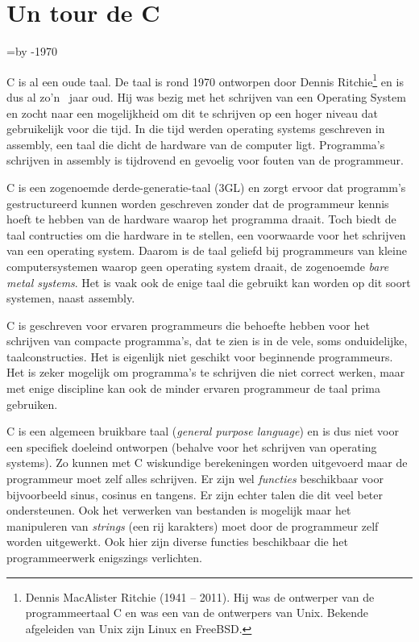 \chapter{Un tour de C}
\thispagestyle{empty}

\newcount\cdifference\cdifference=\the\year\advance\cdifference by -1970

C is al een oude taal. De taal is rond 1970 ontworpen door Dennis Ritchie\footnote{Dennis MacAlister Ritchie (1941 -- 2011). Hij was de ontwerper van de programmeertaal C en was een van de ontwerpers van Unix. Bekende afgeleiden van Unix zijn Linux en FreeBSD.} en is dus al zo'n \the\cdifference\ jaar oud. Hij was bezig met het schrijven van een Operating System en zocht naar een mogelijkheid om dit te schrijven op een hoger niveau dat gebruikelijk voor die tijd. In die tijd werden operating systems geschreven in assembly, een taal die dicht de hardware van de computer ligt. Programma's schrijven in assembly is tijdrovend en gevoelig voor fouten van de programmeur.

C is een zogenoemde derde-generatie-taal (3GL) en zorgt ervoor dat programm's gestructureerd kunnen worden geschreven zonder dat de programmeur kennis hoeft te hebben van de hardware waarop het programma draait. Toch biedt de taal contructies om die hardware in te stellen, een voorwaarde voor het schrijven van een operating system. Daarom is de taal geliefd bij programmeurs van kleine computersystemen waarop geen operating system draait, de zogenoemde \textsl{bare metal systems}. Het is vaak ook de enige taal die gebruikt kan worden op dit soort systemen, naast assembly.

C is geschreven voor ervaren programmeurs die behoefte hebben voor het schrijven van compacte programma's, dat te zien is in de vele, soms onduidelijke, taalconstructies. Het is eigenlijk niet geschikt voor beginnende programmeurs. Het is zeker mogelijk om programma's te schrijven die niet correct werken, maar met enige discipline kan ook de minder ervaren programmeur de taal prima gebruiken.

C is een algemeen bruikbare taal (\textsl{general purpose language}) en is dus niet voor een specifiek doeleind ontworpen (behalve voor het schrijven van operating systems). Zo kunnen met C wiskundige berekeningen worden uitgevoerd maar de programmeur moet zelf alles schrijven. Er zijn wel \textsl{functies} beschikbaar voor bijvoorbeeld sinus, cosinus en tangens. Er zijn echter talen die dit veel beter ondersteunen. Ook het verwerken van bestanden is mogelijk maar het manipuleren van \textsl{strings} (een rij karakters) moet door de programmeur zelf worden uitgewerkt. Ook hier zijn diverse functies beschikbaar die het programmeerwerk enigszings verlichten.

